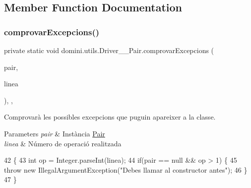 \subsection{Member Function Documentation}
\mbox{\label{classdomini_1_1utils_1_1Driver____Pair_a640e07e7811e0b56a99ca1afb7e16b65}} 
\subsubsection{\texorpdfstring{comprovar\+Excepcions()}{comprovarExcepcions()}}
{\footnotesize\ttfamily private static void domini.\+utils.\+Driver\+\_\+\+\_\+\+Pair.\+comprovar\+Excepcions (\begin{DoxyParamCaption}\item[{\hyperlink{classdomini_1_1utils_1_1Pair}{Pair}$<$ Byte, Byte $>$}]{pair,  }\item[{String}]{linea }\end{DoxyParamCaption})\hspace{0.3cm}{\ttfamily [inline]}, {\ttfamily [static]}, {\ttfamily [private]}}



Comprovarà les possibles excepcions que puguin apareixer a la classe. 


\begin{DoxyParams}{Parameters}
{\em pair} & Instància \hyperlink{classdomini_1_1utils_1_1Pair}{Pair} \\
\hline
{\em linea} & Número de operació realitzada \\
\hline
\end{DoxyParams}

\begin{DoxyCode}
42                                                                                 \{
43         \textcolor{keywordtype}{int} op = Integer.parseInt(linea);
44         \textcolor{keywordflow}{if}(pair == null && op > 1) \{
45             \textcolor{keywordflow}{throw} \textcolor{keyword}{new} IllegalArgumentException(\textcolor{stringliteral}{"Debes llamar al constructor antes"});
46         \}
47     \}
\end{DoxyCode}
\mbox{\label{classdomini_1_1utils_1_1Driver____Pair_a6f6dda90b506c692dd03c4fc174550b7}} 
